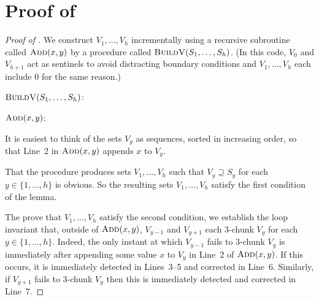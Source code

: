 \documentclass[kpfonts]{patmorin}
\begin{document}
  



\appendix

\section{Proof of }


\begin{proof}[Proof of ]
  We construct $V_1,\ldots,V_{h}$ incrementally using a recursive subroutine called $\textsc{Add}(x, y)$ by a procedure called $\textsc{BuildV}(S_1,\ldots,S_h)$.  (In this code, $V_0$ and $V_{h+1}$ act as sentinels to avoid distracting boundary conditions and $V_1,\ldots,V_h$ each include $0$ for the same reason.)
  
  \noindent$\textsc{BuildV}(S_1,\ldots,S_h)$:
  \begin{algorithmic}[1]
        \ENDIF
      \ENDFOR
    \ENDFOR
  \end{algorithmic}
  
  \noindent$\textsc{Add}(x, y)$:
  \begin{algorithmic}[1]
        \ENDIF
      \ENDIF
    \ENDIF
  \end{algorithmic}
  
  It is easiest to think of the sets $V_y$ as sequences, sorted in increasing order, so that Line~2 in $\textsc{Add}(x,y)$ appends $x$ to $V_y$.
  
  That the procedure produces sets $V_1,\ldots,V_h$ such that $V_y\supseteq S_y$ for each $y\in\{1,\ldots,h\}$ is obvious.  So the resulting sets $V_1,\ldots,V_h$ satisfy the first condition of the lemma.
  
  The prove that $V_1,\ldots,V_h$ satisfy the second condition, we establish the loop invariant that, outside of $\textsc{Add}(x,y)$, $V_{y-1}$ and $V_{y+1}$ each 3-chunk  $V_y$ for each $y\in\{1,\ldots,h\}$.  Indeed, the only instant at which $V_{y-1}$ fails to 3-chunk $V_y$ is immediately after appending some value $x$ to $V_y$ in Line~2 of $\textsc{Add}(x,y)$.  If this occurs, it is immediately detected in Lines~3--5 and corrected in Line~6.  Similarly, if $V_{y+1}$ fails to $3$-chunk $V_y$ then this is immediately detected and corrected in Line~7.
  

\end{proof}
\end{document}
